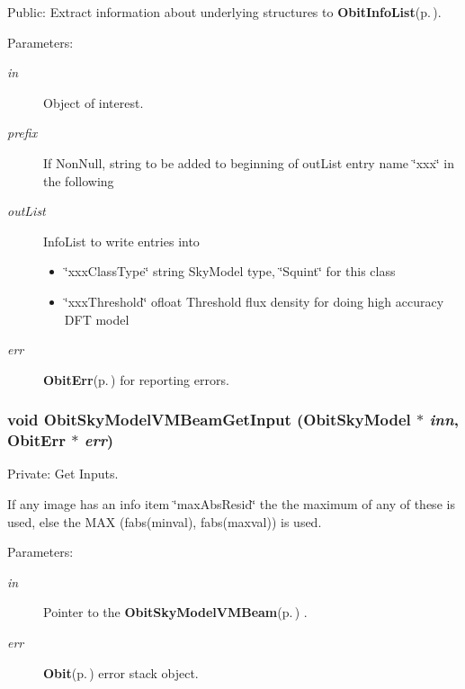 Public: Extract information about underlying structures to {\bf Obit\-Info\-List}{\rm (p.\,\pageref{structObitInfoList})}. 

\begin{Desc}
\item[Parameters:]
\begin{description}
\item[{\em in}]Object of interest. \item[{\em prefix}]If Non\-Null, string to be added to beginning of out\-List entry name \char`\"{}xxx\char`\"{} in the following \item[{\em out\-List}]Info\-List to write entries into \begin{itemize}
\item \char`\"{}xxx\-Class\-Type\char`\"{} string Sky\-Model type, \char`\"{}Squint\char`\"{} for this class \item \char`\"{}xxx\-Threshold\char`\"{} ofloat Threshold flux density for doing high accuracy DFT model \end{itemize}
\item[{\em err}]{\bf Obit\-Err}{\rm (p.\,\pageref{structObitErr})} for reporting errors. \end{description}
\end{Desc}
\subsubsection{\setlength{\rightskip}{0pt plus 5cm}void Obit\-Sky\-Model\-VMBeam\-Get\-Input ({\bf Obit\-Sky\-Model} $\ast$ {\em inn}, {\bf Obit\-Err} $\ast$ {\em err})}\label{ObitSkyModelVMBeam_8c_a9}


Private: Get Inputs. 

If any image has an info item \char`\"{}max\-Abs\-Resid\char`\"{} the the maximum of any of these is used, else the MAX (fabs(minval), fabs(maxval)) is used. \begin{Desc}
\item[Parameters:]
\begin{description}
\item[{\em in}]Pointer to the {\bf Obit\-Sky\-Model\-VMBeam}{\rm (p.\,\pageref{structObitSkyModelVMBeam})} . \item[{\em err}]{\bf Obit}{\rm (p.\,\pageref{structObit})} error stack object. \end{description}
\end{Desc}
